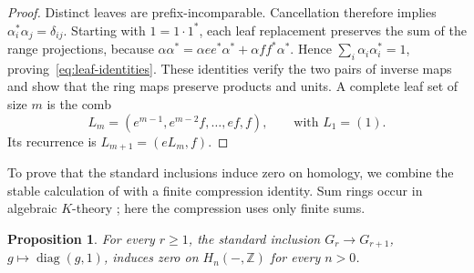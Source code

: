 \documentclass[11pt]{amsart}
\newcommand{\Z}{\mathbb Z}
\newtheorem{proposition}[theorem]{Proposition}
\theoremstyle{definition}
\theoremstyle{remark}
\numberwithin{equation}{section}
\begin{document}
\begin{proof}
Distinct leaves are prefix-incomparable. Cancellation therefore implies $\alpha_i^*\alpha_j=\delta_{ij}$. Starting with $1=1\cdot1^*$, each leaf replacement preserves the sum of the range projections, because $\alpha\alpha^*=\alpha ee^*\alpha^*+\alpha ff^*\alpha^*$. Hence $\sum_i\alpha_i\alpha_i^*=1$, proving~\eqref{eq:leaf-identities}. These identities verify the two pairs of inverse maps and show that the ring maps preserve products and units. A complete leaf set of size $m$ is the comb
$$
L_m=(e^{m-1},e^{m-2}f,\ldots,ef,f),\qquad\text{with }L_1=(1).
$$
Its recurrence is $L_{m+1}=(eL_m,f)$.
\end{proof}

To prove that the standard inclusions induce zero on homology, we combine the stable calculation of \cite{ABC09} with a finite compression identity. Sum rings occur in algebraic $K$-theory \cite[\S2]{Wagoner72}; here the compression uses only finite sums.

\begin{proposition}\label{prop:zero-padding}
For every $r\geq1$, the standard inclusion $G_r\to G_{r+1}$, $g\mapsto\operatorname{diag}(g,1)$, induces zero on $H_n(-,\Z)$ for every $n>0$.
\end{proposition}
\end{document}
